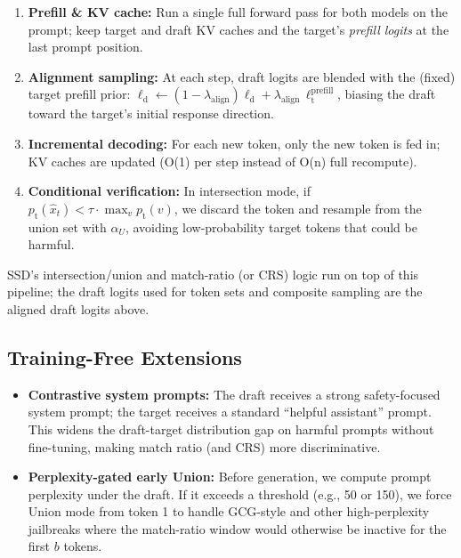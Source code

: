 \documentclass[11pt,a4paper]{article}
\begin{document}
\begin{enumerate}
  \item \textbf{Prefill \& KV cache:} Run a single full forward pass for both models on the prompt; keep target and draft KV caches and the target's \emph{prefill logits} at the last prompt position.
  \item \textbf{Alignment sampling:} At each step, draft logits are blended with the (fixed) target prefill prior: $\ell_{\mathrm{d}} \leftarrow (1-\lambda_{\mathrm{align}}) \ell_{\mathrm{d}} + \lambda_{\mathrm{align}} \,\ell_{\mathrm{t}}^{\mathrm{prefill}}$, biasing the draft toward the target's initial response direction.
  \item \textbf{Incremental decoding:} For each new token, only the new token is fed in; KV caches are updated (O(1) per step instead of O(n) full recompute).
  \item \textbf{Conditional verification:} In intersection mode, if $p_{\mathrm{t}}(\hat{x}_t) < \tau \cdot \max_v p_{\mathrm{t}}(v)$, we discard the token and resample from the union set with $\alpha_U$, avoiding low-probability target tokens that could be harmful.
\end{enumerate}

SSD's intersection/union and match-ratio (or CRS) logic run on top of this pipeline; the draft logits used for token sets and composite sampling are the aligned draft logits above.

\subsection{Training-Free Extensions}
\label{sec:trainingfree}

\begin{itemize}
  \item \textbf{Contrastive system prompts:} The draft receives a strong safety-focused system prompt; the target receives a standard ``helpful assistant'' prompt. This widens the draft-target distribution gap on harmful prompts without fine-tuning, making match ratio (and CRS) more discriminative.
  \item \textbf{Perplexity-gated early Union:} Before generation, we compute prompt perplexity under the draft. If it exceeds a threshold (e.g., 50 or 150), we force Union mode from token 1 to handle GCG-style and other high-perplexity jailbreaks where the match-ratio window would otherwise be inactive for the first $b$ tokens.
\end{itemize}
\end{document}
